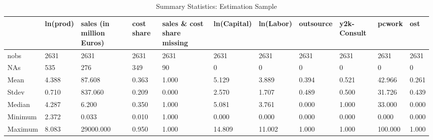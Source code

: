 \begin{table}[ht]
\centering
\caption{Summary Statistics: Estimation Sample} 
\begin{tabular}{p{2cm}|p{2cm}p{2cm}p{2cm}p{2cm}p{2cm}p{2cm}p{2cm}p{}p{}p{}}
  \hline
 & ln(prod) & sales (in million Euros) & cost share & sales \& cost share missing & ln(Capital) & ln(Labor) & outsource & y2k-Consult & pcwork & ost \\ 
  \hline
nobs & 2631 & 2631 & 2631 & 2631 & 2631 & 2631 & 2631 & 2631 & 2631 & 2631 \\ 
  NAs & 535 & 276 & 349 & 90 & 0 & 0 & 0 & 0 & 0 & 0 \\ 
  Mean & 4.388 & 87.608 & 0.363 & 1.000 & 5.129 & 3.889 & 0.394 & 0.521 & 42.966 & 0.261 \\ 
  Stdev & 0.710 & 837.060 & 0.209 & 0.000 & 2.570 & 1.707 & 0.489 & 0.500 & 31.726 & 0.439 \\ 
  Median & 4.287 & 6.200 & 0.350 & 1.000 & 5.081 & 3.761 & 0.000 & 1.000 & 33.000 & 0.000 \\ 
  Minimum & 2.372 & 0.033 & 0.010 & 1.000 & 0.000 & 0.000 & 0.000 & 0.000 & 0.000 & 0.000 \\ 
  Maximum & 8.083 & 29000.000 & 0.950 & 1.000 & 14.809 & 11.002 & 1.000 & 1.000 & 100.000 & 1.000 \\ 
   \hline
\end{tabular}
\end{table}
